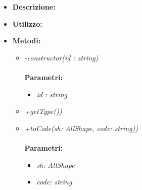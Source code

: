 \begin{itemize}
	\item \textbf{Descrizione:}\\
	
	\item \textbf{Utilizzo:}\\
	
	\item \textbf{Metodi:}
		\begin{itemize}
			\item \emph{-constructor(id : string)}\\
    		\\
    		\textbf{Parametri:}
    		\begin{itemize}
    			\item \emph{id : string}\\
    			
    		\end{itemize}
			\item \emph{+getType())}\\
    		
			\item \emph{+toCode(sh: AllShape, code: string))}\\
    		\\
    		\textbf{Parametri:}
    		\begin{itemize}
    			\item \emph{sh: AllShape}\\
    			
    			\item \emph{code: string}\\
    			
    		\end{itemize}
    	\end{itemize}
\end{itemize}